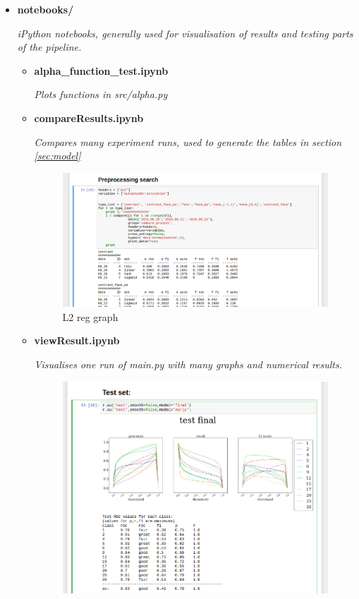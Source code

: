 {\begin{itemize}
\begin{itemize}
                \end{itemize}
        \item   {\bf notebooks/ }
                \begin{sloppypar} \textit{iPython notebooks, generally used for visualisation of results and testing parts of the pipeline.}\end{sloppypar}
                \begin{itemize}
                  \item {\bf alpha\_function\_test.ipynb }
                  \begin{sloppypar} \textit{Plots functions in src/alpha.py}\end{sloppypar}
                  \item {\bf compareResults.ipynb }
                  \begin{sloppypar} \textit{Compares many experiment runs, used to generate the tables in section \ref{sec:model}}\end{sloppypar}
                    \begin{figure}[!h]
                    \centering
                    \includegraphics[width =0.8\hsize]{figures/notebook2.png}
                    \caption{L2 reg graph}
                    \label{fig:compareresults}
                    \end{figure}
                  \item {\bf viewResult.ipynb }
                  \begin{sloppypar} \textit{Visualises one run of main.py with many graphs and numerical results.}\end{sloppypar}
                    \begin{figure}[!h]
                    \centering
                    \includegraphics[width =0.8\hsize]{figures/notebook1.png}

\end{figure}
\end{itemize}
\end{itemize}}
